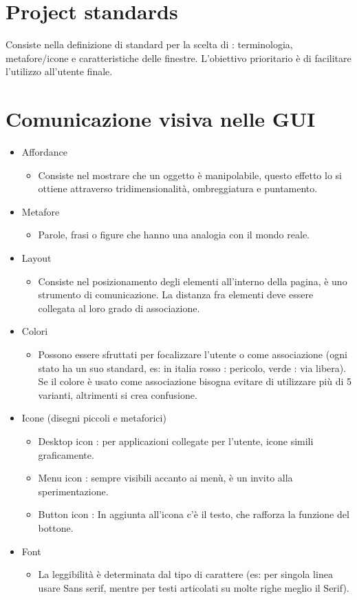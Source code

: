 \documentclass[a4paper,12pt]{report}
\begin{document}
	\section{Project standards}
	Consiste nella definizione di standard per la scelta di : terminologia, metafore/icone e caratteristiche delle finestre. L'obiettivo prioritario è di facilitare l'utilizzo all'utente finale.
	\section{Comunicazione visiva nelle GUI}
	\begin{itemize}
		\item Affordance
		\begin{itemize}
			\item Consiste nel mostrare che un oggetto è manipolabile, questo effetto lo si ottiene attraverso tridimensionalità, ombreggiatura e puntamento.
		\end{itemize}
		\item Metafore
		\begin{itemize}
			\item Parole, frasi o figure che hanno una analogia con il mondo reale.
		\end{itemize}
		\item Layout
		\begin{itemize}
			\item Consiste nel posizionamento degli elementi all'interno della pagina, è uno strumento di comunicazione. La distanza fra elementi deve essere collegata al loro grado di associazione.
		\end{itemize}
		\item Colori
		\begin{itemize}
			\item Possono essere sfruttati per focalizzare l'utente o come associazione (ogni stato ha un suo standard, es: in italia rosso : pericolo, verde : via libera). Se il colore è usato come associazione bisogna evitare di utilizzare più di 5 varianti, altrimenti si crea confusione.
		\end{itemize}
		\item Icone (disegni piccoli e metaforici)
		\begin{itemize}
			\item Desktop icon : per applicazioni collegate per l'utente, icone simili graficamente.
			\item Menu icon : sempre visibili accanto ai menù, è un invito alla sperimentazione.
			\item Button icon : In aggiunta all'icona c'è il testo, che rafforza la funzione del bottone.
		\end{itemize}
		\item Font
		\begin{itemize}
			\item La leggibilità è determinata dal tipo di carattere (es: per singola linea usare Sans serif, mentre per testi articolati su molte righe meglio il Serif).
		\end{itemize}
	\end{itemize}
	\newpage
\end{document}
